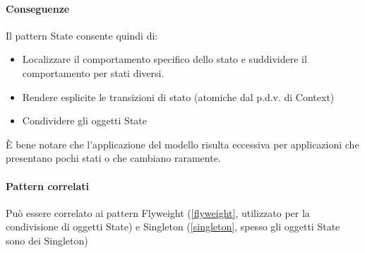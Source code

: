 \paragraph{Conseguenze} Il pattern State consente quindi di:
\begin{itemize}
    \item Localizzare il comportamento specifico dello stato e suddividere il comportamento per stati diversi.
    \item Rendere esplicite le transizioni di stato (atomiche dal p.d.v. di Context)
    \item Condividere gli oggetti State
\end{itemize}

È bene notare che l'applicazione del modello risulta eccessiva per applicazioni che presentano pochi stati o che cambiano raramente.

\paragraph{Pattern correlati} Può essere correlato ai pattern Flyweight (\ref{flyweight}, utilizzato per la condivisione di oggetti State) e Singleton (\ref{singleton}, spesso gli oggetti State sono dei Singleton)

\newpage